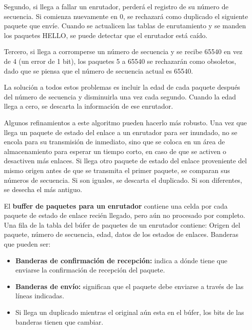 \begin{enumerate}
		\par Segundo, si llega a fallar un enrutador, perderá el registro de su número de secuencia. Si comienza nuevamente en 0, se rechazará como duplicado el siguiente paquete que envíe. Cuando se actualicen las tablas de enrutamiento y se manden los paquetes HELLO, se puede detectar que el enrutador está caído.

		\par Tercero, si llega a corromperse un número de secuencia y se recibe 65540 en vez de 4 (un error de 1 bit), los paquetes 5 a 65540 se rechazarán como obsoletos, dado que se piensa que el número de secuencia actual es 65540.
		
		\par La solución a todos estos problemas es incluir la edad de cada paquete después del número de secuencia y disminuirla una vez cada segundo. Cuando la edad llega a cero, se descarta la información de ese enrutador.

		\par Algunos refinamientos a este algoritmo pueden hacerlo más robusto. Una vez que llega un paquete de estado del enlace a un enrutador para ser inundado, no se encola para su transmisión de inmediato, sino que se coloca en un área de almacenamiento para esperar un tiempo corto, en caso de que se activen o desactiven más enlaces. Si llega otro paquete de estado del enlace proveniente del mismo origen antes de que se transmita el primer paquete, se comparan sus números de secuencia. Si son iguales, se descarta el duplicado. Si son diferentes, se desecha el más antiguo.

		\par El \textbf{buffer de paquetes para un enrutador} contiene una celda por cada paquete de estado de enlace recién llegado, pero aún no procesado por completo. Una fila de la tabla del búfer de paquetes de un enrutador contiene: Origen del paquete, número de secuencia, edad, datos de los estados de enlaces. Banderas que pueden ser:

		\begin{itemize}
			\item \textbf{Banderas de confirmación de recepción:} indica a dónde tiene que enviarse la confirmación de recepción del paquete.
			\item \textbf{Banderas de envío:} significan que el paquete debe enviarse a través de las líneas indicadas.
			\item Si llega un duplicado mientras el original aún esta en el búfer, los bits de las banderas tienen que cambiar.
		\end{itemize}
		

\end{enumerate}
